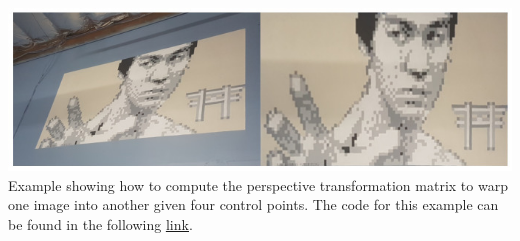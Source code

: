 \begin{tcolorbox}[every float=\centering, drop shadow, title=Example 5: Geometric Image transformation]
    \label{fig:examples:geometry}
    \includegraphics[width=1.\linewidth]{main/chapter03/data/examples/bruce_warped.jpg}
    {Example showing how to compute the perspective transformation matrix to warp one image into another given four control points. The code for this example can be found in the following \underline{\color{blue}\href{https://colab.research.google.com/drive/1TgRiOs9x0W98axsb9jDTnYul0pGCeGQv}{link}}.}
    \inputminted[python3, baselinestretch=1., style=vs, fontfamily=courier, fontsize=\footnotesize, funcnamehighlighting=true]{python}{main/chapter03/data/examples/snipet_geometry.py}
\end{tcolorbox}



